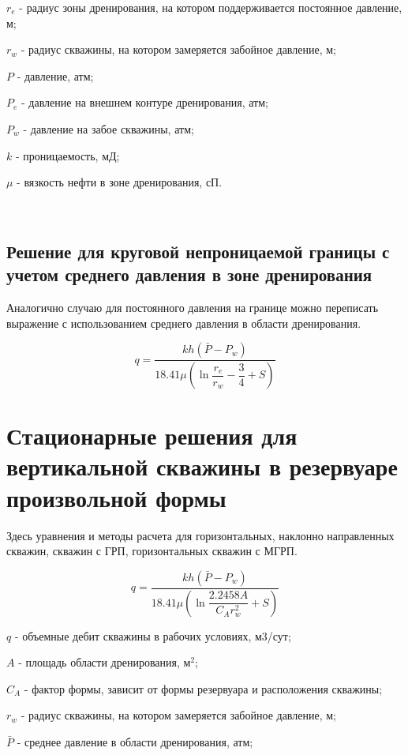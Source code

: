 $r_e$ -  радиус зоны дренирования, на котором поддерживается постоянное давление, м;

$r_w$ - радиус скважины, на котором замеряется забойное давление, м;

$P$ - давление, атм;

$P_e$ - давление на внешнем контуре дренирования, атм;

$P_w$ - давление на забое скважины, атм;

$k$ - проницаемость, мД;

$\mu$ - вязкость нефти в зоне дренирования, сП.

\

\subsection{Решение для круговой непроницаемой границы с учетом среднего давления в зоне дренирования}

Аналогично случаю для постоянного давления на границе можно переписать выражение с использованием среднего давления в области дренирования. 

$$q=\frac{kh\left( \bar{P}-P_w\right)}{ 18.41 \mu\left(\ln{\dfrac{r_e}{r_w}} - \dfrac{3}{4}+ S \right)}$$




\section{Стационарные решения для вертикальной скважины в резервуаре произвольной формы}

Здесь уравнения и методы расчета для горизонтальных, наклонно направленных скважин, скважин с ГРП, горизонтальных скважин с МГРП. 

\begin{equation}
	q=\frac{kh\left( \bar{P}-P_w\right)}{ 18.41 \mu\left(\ln{\dfrac{2.2458 A}{C_A r_w^2}} + S \right)}
\end{equation}

$q$ - объемные дебит скважины в рабочих условиях, м3/сут;

$A$ -  площадь области дренирования, м$^2$;

$C_A$ -  фактор формы, зависит от формы резервуара и расположения скважины;

$r_w$ - радиус скважины, на котором замеряется забойное давление, м;

$\bar{P}$ - среднее давление в области дренирования, атм;

